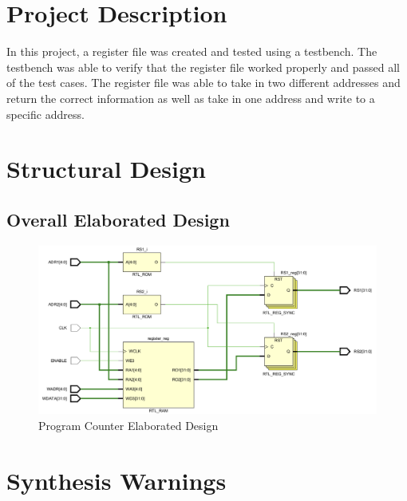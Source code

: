 \documentclass[
    a4paper, %
	12pt, %
    ]{CSSullivanBusinessReport}
\begin{document}
\begin{fullwidth} %

\section{Project Description} %

In this project, a register file was created and tested using a testbench. The testbench was able to verify that the register file worked properly and passed all of the test cases. The register file was able to take in two different addresses and return the correct information as well as take in one address and write to a specific address.


\section{Structural Design} %

\subsection{Overall Elaborated Design} %

\begin{figure}[H]
    \centering
    \captionsetup{style=widetable}
    \includegraphics[width=.80\pdfpagewidth]{Figures/RegFile Elaborated Design.png}
    \caption{Program Counter Elaborated Design}
    \label{fig:PCElaboratedDesign}
\end{figure}


\section{Synthesis Warnings} %


\end{fullwidth}
\end{document}
